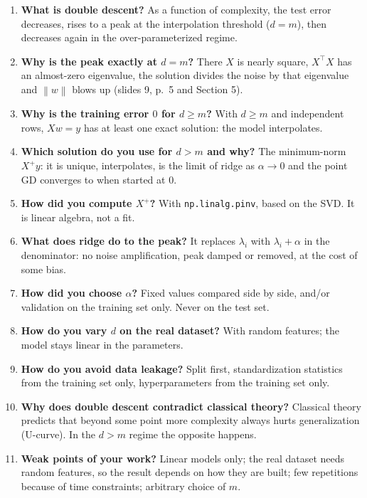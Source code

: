 \documentclass[11pt,a4paper]{article}
\newcommand{\norm}[1]{\left\lVert #1 \right\rVert}
\begin{document}
\begin{enumerate}
  \item \textbf{What is double descent?} As a function of complexity, the test error decreases, rises to a peak at the
        interpolation threshold ($d=m$), then decreases again in the over-parameterized regime.
  \item \textbf{Why is the peak exactly at $d = m$?} There $X$ is nearly square, $X^\top X$ has an almost-zero eigenvalue,
        the solution divides the noise by that eigenvalue and $\norm{w}$ blows up (slides 9, p.~5 and Section 5).
  \item \textbf{Why is the training error $0$ for $d \ge m$?} With $d \ge m$ and independent rows, $Xw = y$ has at least
        one exact solution: the model interpolates.
  \item \textbf{Which solution do you use for $d > m$ and why?} The minimum-norm $X^{+}y$: it is unique, interpolates,
        is the limit of ridge as $\alpha \to 0$ and the point GD converges to when started at $0$.
  \item \textbf{How did you compute $X^{+}$?} With \texttt{np.linalg.pinv}, based on the SVD. It is linear algebra, not a fit.
  \item \textbf{What does ridge do to the peak?} It replaces $\lambda_i$ with $\lambda_i + \alpha$ in the denominator:
        no noise amplification, peak damped or removed, at the cost of some bias.
  \item \textbf{How did you choose $\alpha$?} Fixed values compared side by side, and/or validation on the training set only. Never on the test set.
  \item \textbf{How do you vary $d$ on the real dataset?} With random features; the model stays linear in the parameters.
  \item \textbf{How do you avoid data leakage?} Split first, standardization statistics from the training set only,
        hyperparameters from the training set only.
  \item \textbf{Why does double descent contradict classical theory?} Classical theory predicts that beyond some point more
        complexity always hurts generalization (U-curve). In the $d > m$ regime the opposite happens.
  \item \textbf{Weak points of your work?} Linear models only; the real dataset needs random features, so the result depends
        on how they are built; few repetitions because of time constraints; arbitrary choice of $m$.
\end{enumerate}
\end{document}
